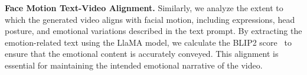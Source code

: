 \noindent\textbf{Face Motion Text-Video Alignment.}
Similarly, we analyze the extent to which the generated video aligns with facial motion, including expressions, head posture, and emotional variations described in the text prompt. 
By extracting the emotion-related text using the LlaMA model, we calculate the BLIP2 score~\cite{li2023blip} to ensure that the emotional content is accurately conveyed. 
This alignment is essential for maintaining the intended emotional narrative of the video.